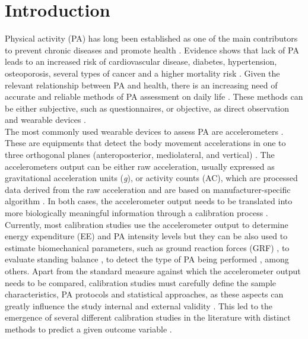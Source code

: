 \documentclass[11pt]{article}
\begin{document}
\section*{Introduction}

Physical activity (PA) has long been established as one of the main contributors to prevent chronic diseases and promote health \cite{Kaminsky_2014, Warburton_2017}. Evidence shows that lack of PA leads to an increased risk of cardiovascular disease, diabetes, hypertension, osteoporosis, several types of cancer and a higher mortality risk \cite{Guthold_2018, Lee_2012, Shiroma_2014}. Given the relevant relationship between PA and health, there is an increasing need of accurate and reliable methods of PA assessment on daily life \cite{Montoye_2000, Plasqui_2013, Strath_2013}. These methods can be either subjective, such as questionnaires, or objective, as direct observation and wearable devices \cite{Strath_2013, Troiano_2005}. \\

The most commonly used wearable devices to assess PA are accelerometers \cite{Strath_2013}. These are equipments that detect the body movement accelerations in one to three orthogonal planes (anteroposterior, mediolateral, and vertical) \cite{Chen_2005}. The accelerometers output can be either raw acceleration, usually expressed as gravitational acceleration units (\textit{g}), or activity counts (AC), which are processed data derived from the raw acceleration and are based on manufacturer-specific algorithm \cite{Chen_2005, Basset_2012, Troiano_2014}. In both cases, the accelerometer output needs to be translated into more biologically meaningful information through a calibration process \cite{Matthews_2005}. \\

Currently, most calibration studies use the accelerometer output to determine energy expenditure (EE) and PA intensity levels \cite{Migueles_2017, Mendes_2018} but they can be also used to estimate biomechanical parameters, such as ground reaction forces (GRF) \cite{Neugebauer_2014, Fortune_2014}, to evaluate standing balance \cite{Mayagoitia_2002}, to detect the type of PA being performed \cite{Bonomi_2009, Zhang_2012}, among others. Apart from the standard measure against which the accelerometer output needs to be compared, calibration studies must carefully define the sample characteristics, PA protocols and statistical approaches, as these aspects can greatly influence the study internal and external validity \cite{Basset_2012, Welk_2005}. This led to the emergence of several different calibration studies in the literature with distinct methods to predict a given outcome variable \cite{Mendes_2018, Matthews_2018}. \\
\end{document}
